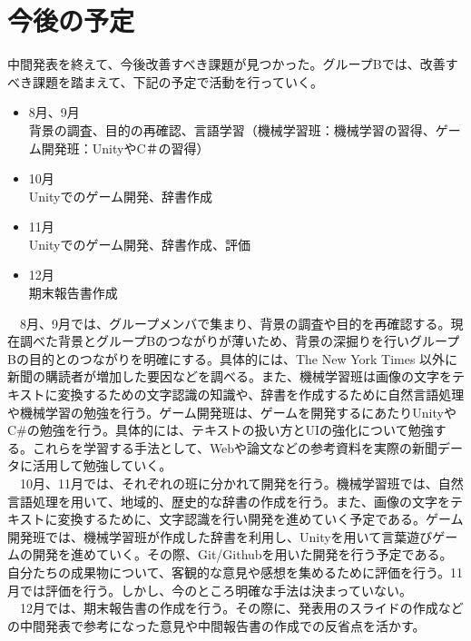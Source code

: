 \section{今後の予定}
中間発表を終えて、今後改善すべき課題が見つかった。グループBでは、改善すべき課題を踏まえて、下記の予定で活動を行っていく。
\begin{itemize}
    \item 8月、9月\\
    背景の調査、目的の再確認、言語学習（機械学習班：機械学習の習得、ゲーム開発班：UnityやC＃の習得）
    \item 10月\\
    Unityでのゲーム開発、辞書作成
    \item 11月\\
    Unityでのゲーム開発、辞書作成、評価
    \item 12月\\
    期末報告書作成
\end{itemize}
　8月、9月では、グループメンバで集まり、背景の調査や目的を再確認する。現在調べた背景とグループBのつながりが薄いため、背景の深掘りを行いグループBの目的とのつながりを明確にする。具体的には、The New York Times 以外に新聞の購読者が増加した要因などを調べる。また、機械学習班は画像の文字をテキストに変換するための文字認識の知識や、辞書を作成するために自然言語処理や機械学習の勉強を行う。ゲーム開発班は、ゲームを開発するにあたりUnityやC\#の勉強を行う。具体的には、テキストの扱い方とUIの強化について勉強する。これらを学習する手法として、Webや論文などの参考資料を実際の新聞データに活用して勉強していく。\\
　10月、11月では、それぞれの班に分かれて開発を行う。機械学習班では、自然言語処理を用いて、地域的、歴史的な辞書の作成を行う。また、画像の文字をテキストに変換するために、文字認識を行い開発を進めていく予定である。ゲーム開発班では、機械学習班が作成した辞書を利用し、Unityを用いて言葉遊びゲームの開発を進めていく。その際、Git/Githubを用いた開発を行う予定である。自分たちの成果物について、客観的な意見や感想を集めるために評価を行う。11月では評価を行う。しかし、今のところ明確な手法は決まっていない。\\
　12月では、期末報告書の作成を行う。その際に、発表用のスライドの作成などの中間発表で参考になった意見や中間報告書の作成での反省点を活かす。